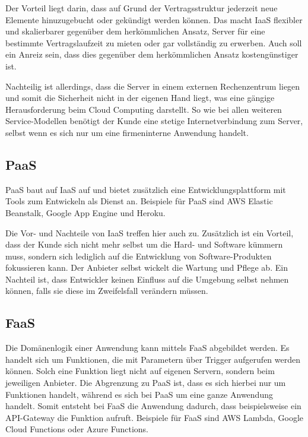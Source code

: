 Der Vorteil liegt darin, dass auf Grund der Vertragsstruktur jederzeit neue Elemente hinuzugebucht oder gekündigt werden können. Das macht \acl{IaaS} flexibler und skalierbarer gegenüber dem herkömmlichen Ansatz, Server für eine bestimmte Vertragslaufzeit zu mieten oder gar vollständig zu erwerben. Auch soll ein Anreiz sein, dass dies gegenüber dem herkömmlichen Ansatz kostengünstiger ist.

Nachteilig ist allerdings, dass die Server in einem externen Rechenzentrum liegen und somit die Sicherheit nicht in der eigenen Hand liegt, was eine gängige Herausforderung beim Cloud Computing darstellt. So wie bei allen weiteren Service-Modellen benötigt der Kunde eine stetige Internetverbindung zum Server, selbst wenn es sich nur um eine firmeninterne Anwendung handelt.

\subsection{\acl{PaaS}}

\acf{PaaS} baut auf \acl{IaaS} auf und bietet zusätzlich eine Entwicklungsplattform mit Tools zum Entwickeln als Dienst an. Beispiele für \ac{PaaS} sind \ac{AWS} Elastic Beanstalk, Google App Engine und Heroku.

Die Vor- und Nachteile von \acl{IaaS} treffen hier auch zu. Zusätzlich ist ein Vorteil, dass der Kunde sich nicht mehr selbst um die Hard- und Software kümmern muss, sondern sich lediglich auf die Entwicklung von Software-Produkten fokussieren kann. Der Anbieter selbst wickelt die Wartung und Pflege ab. Ein Nachteil ist, dass Entwickler keinen Einfluss auf die Umgebung selbst nehmen können, falls sie diese im Zweifelsfall verändern müssen.

\subsection{\acl{FaaS}}

Die Domänenlogik einer Anwendung kann mittels \acf{FaaS} abgebildet werden. Es handelt sich um Funktionen, die mit Parametern über Trigger aufgerufen werden können. Solch eine Funktion liegt nicht auf eigenen Servern, sondern beim jeweiligen Anbieter. Die Abgrenzung zu \ac{PaaS} ist, dass es sich hierbei nur um Funktionen handelt, während es sich bei \ac{PaaS} um eine ganze Anwendung handelt. Somit entsteht bei \ac{FaaS} die Anwendung dadurch, dass beispielsweise ein API-Gateway die Funktion aufruft. Beispiele für \ac{FaaS} sind \ac{AWS} Lambda, Google Cloud Functions oder Azure Functions.

